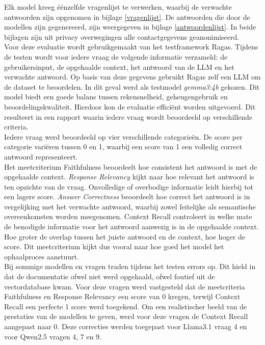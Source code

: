 Elk model kreeg éénzelfde vragenlijst te verwerken, waarbij de verwachte antwoorden zijn opgenomen in bijlage \ref{vragenlijst}.
De antwoorden die door de modellen zijn gegenereerd, zijn weergegeven in bijlage \ref{antwoordenlijst}.
In beide bijlagen zijn uit privacy overwegingen alle contactgegevens geanonimiseerd.
\\[1em]
Voor deze evaluatie wordt gebruikgemaakt van het testframework Ragas. Tijdens de testen wordt voor iedere vraag de volgende informatie verzameld: de gebruikersinput, de opgehaalde context, het antwoord van de LLM en het verwachte antwoord. Op basis van deze gegevens gebruikt Ragas zelf een LLM om de dataset te beoordelen. In dit geval werd als testmodel \textit{gemma3:4b} gekozen. Dit model biedt een goede balans tussen rekensnelheid, geheugengebruik en beoordelingskwaliteit. Hierdoor kon de evaluatie efficiënt worden uitgevoerd. Dit resulteert in een rapport waarin iedere vraag wordt beoordeeld op verschillende criteria.
\\[1em]
Iedere vraag werd beoordeeld op vier verschillende categorieën. De score per categorie variëren tussen 0 en 1, waarbij een score van 1 een volledig correct antwoord representeert.
\\[1em]
Het meetcriterium Faithfulness beoordeelt hoe consistent het antwoord is met de opgehaalde context. \textit{Response Relevancy} kijkt naar hoe relevant het antwoord is ten opzichte van de vraag. Onvolledige of overbodige informatie leidt hierbij tot een lagere score. \textit{Answer Correctness} beoordeelt hoe correct het antwoord is in vergelijking met het verwachte antwoord, waarbij zowel feitelijke als semantische overeenkomsten worden meegenomen. Context Recall controleert in welke mate de benodigde informatie voor het antwoord aanwezig is in de opgehaalde context. Hoe groter de overlap tussen het juiste antwoord en de context, hoe hoger de score. Dit meetcriterium kijkt dus vooral naar hoe goed het model het ophaalproces aanstuurt.
\\[1em]
Bij sommige modellen en vragen traden tijdens het testen errors op. Dit hield in dat de documentatie ofwel niet werd opgehaald, ofwel foutief uit de vectordatabase kwam. Voor deze vragen werd vastgesteld dat de meetcriteria Faithfulness en Response Relevancy een score van 0 kregen, terwijl Context Recall een perfecte 1 score werd toegekend. Om een realistischer beeld van de prestaties van de modellen te geven, werd voor deze vragen de Context Recall aangepast naar 0. Deze correcties werden toegepast voor Llama3.1 vraag 4 en voor Qwen2.5 vragen 4, 7 en 9.

